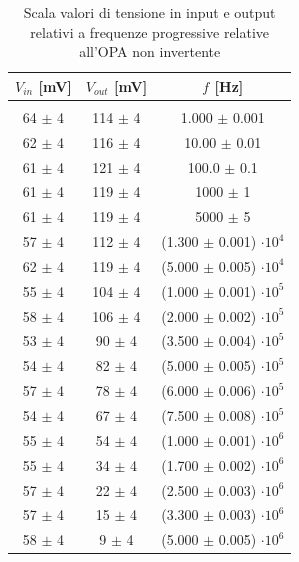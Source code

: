 \documentclass[journal]{IEEEtran}
\begin{document}
\begin{table}[H]
\centering
    
\begin{tabular}{c|c|c}
\multicolumn{1}{c|}{$V_{in}$ {[}mV{]}} & \multicolumn{1}{|c|}{$V_{out}$ {[}mV{]}} & \multicolumn{1}{c}{$f$ {[}Hz{]}}\\ 
\hline  \\
64 $\pm$ 4 & 114 $\pm$ 4 & 1.000 $\pm$ 0.001 \\
62 $\pm$ 4 & 116 $\pm$ 4 & 10.00 $\pm$ 0.01  \\
61 $\pm$ 4  & 121 $\pm$ 4 & 100.0 $\pm$ 0.1  \\
61 $\pm$ 4  & 119 $\pm$ 4 & 1000 $\pm$ 1     \\
61 $\pm$ 4  & 119 $\pm$ 4 & 5000 $\pm$ 5     \\
57 $\pm$ 4  & 112 $\pm$ 4 & (1.300 $\pm$ 0.001) $\cdot 10^4$    \\
62 $\pm$ 4  & 119 $\pm$ 4 & (5.000 $\pm$ 0.005) $\cdot 10^4$    \\
55 $\pm$ 4  & 104 $\pm$ 4 & (1.000 $\pm$ 0.001) $\cdot 10^5$  \\
58 $\pm$ 4  & 106 $\pm$ 4 & (2.000 $\pm$ 0.002) $\cdot 10^5$   \\
53 $\pm$ 4  & 90 $\pm$ 4  & (3.500 $\pm$ 0.004) $\cdot 10^5$   \\
54 $\pm$ 4  & 82 $\pm$ 4  & (5.000 $\pm$ 0.005) $\cdot 10^5$  \\
57 $\pm$ 4  & 78 $\pm$ 4  & (6.000 $\pm$ 0.006) $\cdot 10^5$   \\
54 $\pm$ 4  & 67 $\pm$ 4  & (7.500 $\pm$ 0.008) $\cdot 10^5$   \\
55 $\pm$ 4  & 54 $\pm$ 4  & (1.000 $\pm$ 0.001) $\cdot 10^6$ \\
55 $\pm$ 4  & 34 $\pm$ 4  & (1.700 $\pm$ 0.002) $\cdot 10^6$ \\
57 $\pm$ 4  & 22 $\pm$ 4  & (2.500 $\pm$ 0.003) $\cdot 10^6$\\
57 $\pm$ 4  & 15 $\pm$ 4  & (3.300 $\pm$ 0.003) $\cdot 10^6$ \\
58 $\pm$ 4  & 9 $\pm$ 4   & (5.000 $\pm$ 0.005) $\cdot 10^6$ \\
\end{tabular}
\vspace{5 mm}
\caption{Scala valori di tensione in input e output relativi a frequenze progressive relative all'OPA non invertente}
\label{tab:opa-non-inv}
\end{table}
\end{document}
